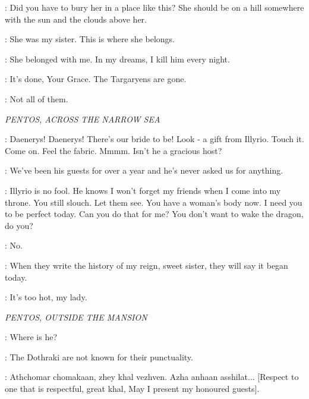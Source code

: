 \ROBERT: Did you have to bury her in a place like this? She should be on a hill somewhere with the sun and the clouds above her. 

\NED: She was my sister. This is where she belongs. 

\ROBERT: She belonged with me. In my dreams, I kill him every night. 

\NED: It's done, Your Grace. The Targaryens are gone. 

\ROBERT: Not all of them. 


\scene

\textit{PENTOS, ACROSS THE NARROW SEA} 


\VISERYS: Daenerys! Daenerys! There's our bride to be! Look - a gift from Illyrio. Touch it. Come on. Feel the fabric. Mmmm. Isn't he a gracious host? 

\DAENERYS: We've been his guests for over a year and he's never asked us for anything. 

\VISERYS: Illyrio is no fool. He knows I won't forget my friends when I come into my throne. You still slouch. Let them see.  You have a woman's body now.  I need you to be perfect today. Can you do that for me? You don't want to wake the dragon, do you? 

\DAENERYS: No. 


\VISERYS: When they write the history of my reign, sweet sister, they will say it began today. 


\MAID: It's too hot, my lady. 


\scene

\textit{PENTOS, OUTSIDE THE MANSION} 


\VISERYS: Where is he? 

\ILLYRIO: The Dothraki are not known for their punctuality. 


\ILLYRIO: Athchomar chomakaan, zhey khal vezhven. Azha anhaan asshilat$\ldots$ [Respect to one that is respectful, great khal, May I present my honoured guests]. 

